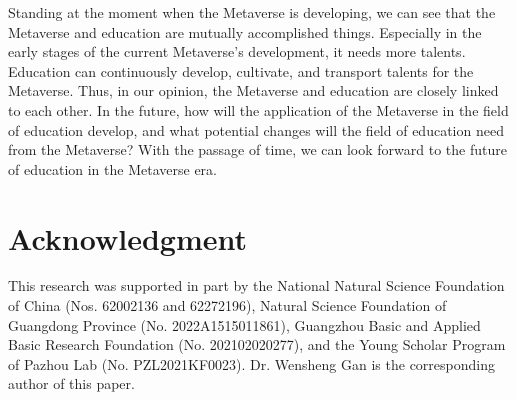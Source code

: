 \documentclass[conference]{IEEEtran}
\begin{document}
Standing at the moment when the Metaverse is developing, we can see that the Metaverse and education are mutually accomplished things. Especially in the early stages of the current Metaverse's development, it needs more talents. Education can continuously develop, cultivate, and transport talents for the Metaverse. Thus, in our opinion, the Metaverse and education are closely linked to each other. In the future, how will the application of the Metaverse in the field of education develop, and what potential changes will the field of education need from the Metaverse? With the passage of time, we can look forward to the future of education in the Metaverse era.


\section*{Acknowledgment}

This research was supported in part by the National Natural Science Foundation of China (Nos. 62002136 and 62272196), Natural Science Foundation of Guangdong Province (No. 2022A1515011861), Guangzhou Basic and Applied Basic Research Foundation (No. 202102020277), and the Young Scholar Program of Pazhou Lab (No. PZL2021KF0023). Dr. Wensheng Gan is the corresponding author of this paper.




%   






\end{document}
